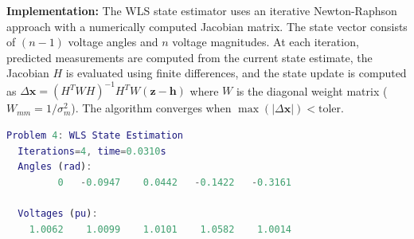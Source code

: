 \documentclass{article}
\begin{document}
\textbf{Implementation:} The WLS state estimator uses an iterative Newton-Raphson approach with a numerically computed Jacobian matrix. The state vector consists of $(n-1)$ voltage angles and $n$ voltage magnitudes. At each iteration, predicted measurements are computed from the current state estimate, the Jacobian $H$ is evaluated using finite differences, and the state update is computed as $\Delta \mathbf{x} = (H^T W H)^{-1} H^T W (\mathbf{z} - \mathbf{h})$ where $W$ is the diagonal weight matrix ($W_{mm} = 1/\sigma_m^2$). The algorithm converges when $\max(|\Delta \mathbf{x}|) < \text{toler}$.

\begin{lstlisting}[language=Matlab]
Problem 4: WLS State Estimation
  Iterations=4, time=0.0310s
  Angles (rad):
         0   -0.0947    0.0442   -0.1422   -0.3161

  Voltages (pu):
    1.0062    1.0099    1.0101    1.0582    1.0014
\end{lstlisting}
\end{document}
